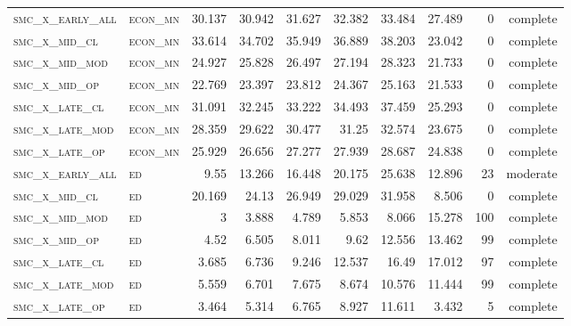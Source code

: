 \begin{landscape}
\begin{center}
\begin{footnotesize}
\begin{longtable}{llrrrrr|rrr}
\textsc{smc\_x\_early\_all} & \textsc{econ\_mn  }   & 30.137     & 30.942     & 31.627     & 32.382     & 33.484     & 27.489     & 0     & complete   \\
\textsc{smc\_x\_mid\_cl   } & \textsc{econ\_mn  }   & 33.614     & 34.702     & 35.949     & 36.889     & 38.203     & 23.042     & 0     & complete   \\
\textsc{smc\_x\_mid\_mod  } & \textsc{econ\_mn  }   & 24.927     & 25.828     & 26.497     & 27.194     & 28.323     & 21.733     & 0     & complete   \\
\textsc{smc\_x\_mid\_op   } & \textsc{econ\_mn  }   & 22.769     & 23.397     & 23.812     & 24.367     & 25.163     & 21.533     & 0     & complete   \\
\textsc{smc\_x\_late\_cl  } & \textsc{econ\_mn  }   & 31.091     & 32.245     & 33.222     & 34.493     & 37.459     & 25.293     & 0     & complete   \\
\textsc{smc\_x\_late\_mod } & \textsc{econ\_mn  }   & 28.359     & 29.622     & 30.477     & 31.25      & 32.574     & 23.675     & 0     & complete   \\
\textsc{smc\_x\_late\_op  } & \textsc{econ\_mn  }   & 25.929     & 26.656     & 27.277     & 27.939     & 28.687     & 24.838     & 0     & complete   \\
\textsc{smc\_x\_early\_all} & \textsc{ed        }   & 9.55       & 13.266     & 16.448     & 20.175     & 25.638     & 12.896     & 23    & moderate   \\
\textsc{smc\_x\_mid\_cl   } & \textsc{ed        }   & 20.169     & 24.13      & 26.949     & 29.029     & 31.958     & 8.506      & 0     & complete   \\
\textsc{smc\_x\_mid\_mod  } & \textsc{ed        }   & 3          & 3.888      & 4.789      & 5.853      & 8.066      & 15.278     & 100   & complete   \\
\textsc{smc\_x\_mid\_op   } & \textsc{ed        }   & 4.52       & 6.505      & 8.011      & 9.62       & 12.556     & 13.462     & 99    & complete   \\
\textsc{smc\_x\_late\_cl  } & \textsc{ed        }   & 3.685      & 6.736      & 9.246      & 12.537     & 16.49      & 17.012     & 97    & complete   \\
\textsc{smc\_x\_late\_mod } & \textsc{ed        }   & 5.559      & 6.701      & 7.675      & 8.674      & 10.576     & 11.444     & 99    & complete   \\
\textsc{smc\_x\_late\_op  } & \textsc{ed        }   & 3.464      & 5.314      & 6.765      & 8.927      & 11.611     & 3.432      & 5     & complete   \\

\end{longtable}
\end{footnotesize}
\end{center}
\end{landscape}

